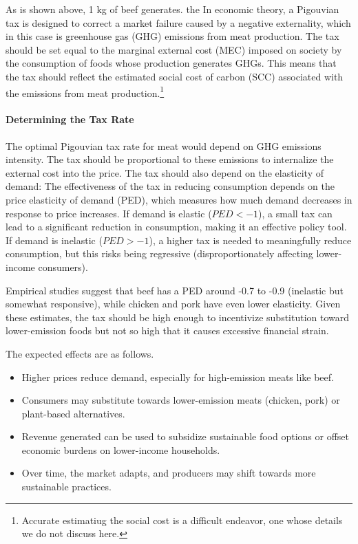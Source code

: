 \documentclass{article}[12pt,letterpaper]
\begin{document}
As is shown above, 1 kg of beef generates. the In economic theory, a Pigouvian tax is designed to correct a market failure caused by a negative externality, which in this case is greenhouse gas (GHG) emissions from meat production. The tax should be set equal to the marginal external cost (MEC) imposed on society by the consumption of foods whose production generates GHGs. This means that the tax should reflect the estimated social cost of carbon (SCC) associated with the emissions from meat production.\footnote{Accurate estimatiug the social cost is a difficult endeavor, one whose details we do not discuss here.}




\paragraph{Determining the Tax Rate}
The optimal Pigouvian tax rate for meat would depend on GHG emissions intensity. The tax should be proportional to these emissions to internalize the external cost into the price.  The tax should also depend on the elasticity of demand: The effectiveness of the tax in reducing consumption depends on the price elasticity of demand (PED), which measures how much demand decreases in response to price increases. If demand is elastic ($PED < -1$), a small tax can lead to a significant reduction in consumption, making it an effective policy tool. If demand is inelastic ($PED > -1$), a higher tax is needed to meaningfully reduce consumption, but this risks being regressive (disproportionately affecting lower-income consumers).

Empirical studies suggest that beef has a PED around -0.7 to -0.9 (inelastic but somewhat responsive), while chicken and pork have even lower elasticity. Given these estimates, the tax should be high enough to incentivize substitution toward lower-emission foods but not so high that it causes excessive financial strain.  


The expected effects are as follows. 
\begin{itemize}
\item Higher prices reduce demand, especially for high-emission meats like beef.  
\item Consumers may substitute towards lower-emission meats (chicken, pork) or plant-based alternatives.  
\item Revenue generated can be used to subsidize sustainable food options or offset economic burdens on lower-income households.  
\item Over time, the market adapts, and producers may shift towards more sustainable practices.  
\end{itemize}
\end{document}
